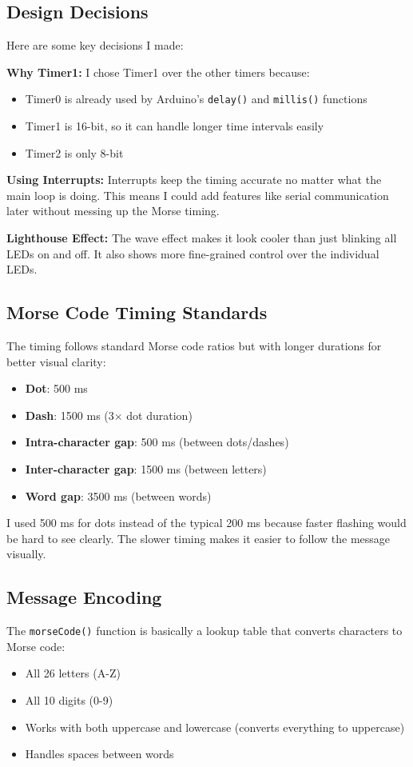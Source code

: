 \documentclass[report]{IEEEtran}
\begin{document}
\subsection{Design Decisions}
Here are some key decisions I made:

\textbf{Why Timer1:}
I chose Timer1 over the other timers because:
\begin{itemize}
    \item Timer0 is already used by Arduino's \texttt{delay()} and \texttt{millis()} functions
    \item Timer1 is 16-bit, so it can handle longer time intervals easily
    \item Timer2 is only 8-bit
\end{itemize}

\textbf{Using Interrupts:}
Interrupts keep the timing accurate no matter what the main loop is doing. This means I could add features like serial communication later without messing up the Morse timing.

\textbf{Lighthouse Effect:}
The wave effect makes it look cooler than just blinking all LEDs on and off. It also shows more fine-grained control over the individual LEDs.

\subsection{Morse Code Timing Standards}
The timing follows standard Morse code ratios but with longer durations for better visual clarity:
\begin{itemize}
    \item \textbf{Dot}: 500 ms
    \item \textbf{Dash}: 1500 ms (3× dot duration)
    \item \textbf{Intra-character gap}: 500 ms (between dots/dashes)
    \item \textbf{Inter-character gap}: 1500 ms (between letters)
    \item \textbf{Word gap}: 3500 ms (between words)
\end{itemize}

I used 500 ms for dots instead of the typical 200 ms because faster flashing would be hard to see clearly. 
The slower timing makes it easier to follow the message visually.

\subsection{Message Encoding}
The \texttt{morseCode()} function is basically a lookup table that converts characters to Morse code:
\begin{itemize}
    \item All 26 letters (A-Z)
    \item All 10 digits (0-9)
    \item Works with both uppercase and lowercase (converts everything to uppercase)
    \item Handles spaces between words
\end{itemize}
\end{document}
